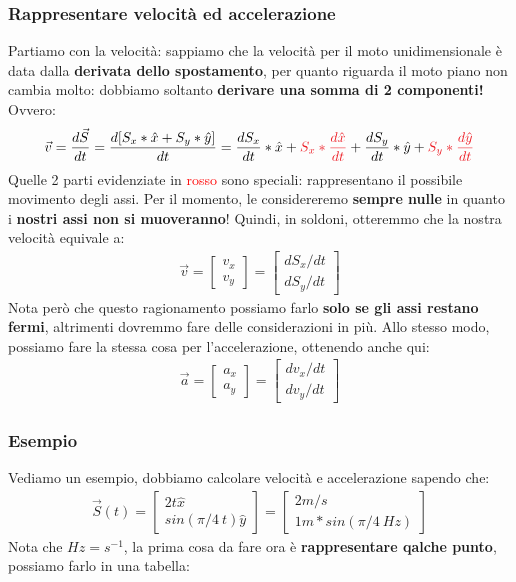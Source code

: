 			\subsubsection{Rappresentare velocità ed accelerazione}
				Partiamo con la velocità: sappiamo che la velocità per il moto unidimensionale è data dalla \textbf{derivata dello spostamento}, per quanto riguarda il moto piano non cambia molto: dobbiamo soltanto \textbf{derivare una somma di 2 componenti!} Ovvero:
				\begin{align*}
					\vec{v} = \frac{d\vec{S}}{dt} = \frac{d[S_x*\hat{x} + S_y*\hat{y}]}{dt} = \frac{d S_x}{dt}*\hat{x}+\textcolor{Red}{S_x*\frac{d \hat{x}}{dt}}+\frac{d S_y}{dt}*\hat{y}+\textcolor{Red}{S_y*\frac{d \hat{y}}{dt}}
				\end{align*}
				Quelle 2 parti evidenziate in \textcolor{Red}{rosso} sono speciali: rappresentano il possibile movimento degli assi. Per il momento, le considereremo \textbf{sempre nulle} in quanto i \textbf{nostri assi non si muoveranno}! Quindi, in soldoni, otteremmo che la nostra velocità equivale a:
				\begin{align*}
					\vec{v} =
					\begin{bmatrix}
						v_x\\
						v_y
					\end{bmatrix}=
					\begin{bmatrix}
						dS_x/dt\\
						dS_y/dt
					\end{bmatrix}
				\end{align*}
				Nota però che questo ragionamento possiamo farlo \textbf{solo se gli assi restano fermi}, altrimenti dovremmo fare delle considerazioni in più. Allo stesso modo, possiamo fare la stessa cosa per l'accelerazione, ottenendo anche qui:
				\begin{align*}
					\vec{a} =
					\begin{bmatrix}
						a_x\\
						a_y
					\end{bmatrix}=
					\begin{bmatrix}
						dv_x/dt\\
						dv_y/dt
					\end{bmatrix}
				\end{align*}

			\subsubsection{Esempio}
				Vediamo un esempio, dobbiamo calcolare velocità e accelerazione sapendo che:
				\begin{align*}
					\vec{S}(t) =
					\begin{bmatrix}
						2t\hat{x}\\
						sin(\pi/4\ t)\hat{y}
					\end{bmatrix}=
					\begin{bmatrix}
						2m/s\\
						1m * sin(\pi/4\ Hz)
					\end{bmatrix}
				\end{align*}
				Nota che $Hz = s^{-1}$, la prima cosa da fare ora è \textbf{rappresentare qalche punto}, possiamo farlo in una tabella:

